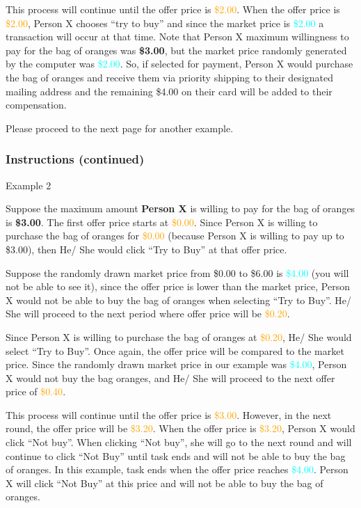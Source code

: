 \documentclass[12pt]{article}
\begin{document}
This process will continue until the offer price is \textcolor{orange}{\$2.00}. When the offer price is \textcolor{orange}{\$2.00}, Person X chooses “try to buy” and since the market price is \textcolor{cyan}{\$2.00} a transaction will occur at that time. Note that Person X maximum willingness to pay for the bag of oranges was \textbf{\$3.00}, but the market price randomly generated by the computer was \textcolor{cyan}{\$2.00}. So, if selected for payment, Person X would purchase the bag of oranges and receive them via priority shipping to their designated mailing address and the remaining \$4.00 on their card will be added to their compensation.



Please proceed to the next page for another example.
\clearpage

\subsubsection*{\textbf{Instructions (continued)}}

Example 2

Suppose the maximum amount \textbf{Person X} is willing to pay for the bag of oranges is \textbf{\$3.00}. The first offer price starts at \textcolor{orange}{\$0.00}. Since Person X is willing to purchase the bag of oranges for \textcolor{orange}{\$0.00} (because Person X is willing to pay up to \$3.00), then He/ She would click “Try to Buy” at that offer price.

Suppose the randomly drawn market price from \$0.00 to \$6.00 is \textcolor{cyan}{\$4.00} (you will not be able to see it), since the offer price is lower than the market price, Person X would not be able to buy the bag of oranges when selecting “Try to Buy”. He/ She will proceed to the next period where offer price will be \textcolor{orange}{\$0.20}.

Since Person X is willing to purchase the bag of oranges at \textcolor{orange}{\$0.20}, He/ She would select “Try to Buy”. Once again, the offer price will be compared to the market price. Since the randomly drawn market price in our example was \textcolor{cyan}{\$4.00}, Person X would not buy the bag oranges, and He/ She will proceed to the next offer price of \textcolor{orange}{\$0.40}.


This process will continue until the offer price is \textcolor{orange}{\$3.00}.  However, in the next round, the offer price will be \textcolor{orange}{\$3.20}. When the offer price is \textcolor{orange}{\$3.20}, Person X would click “Not buy”. When clicking “Not buy”, she will go to the next round and will continue to click “Not Buy” until task ends and will not be able to buy the bag of oranges. In this example, task ends when the offer price reaches \textcolor{cyan}{\$4.00}. Person X will click “Not Buy” at this price and will not be able to buy the bag of oranges.
\vspace{0.5cm}
\end{document}
